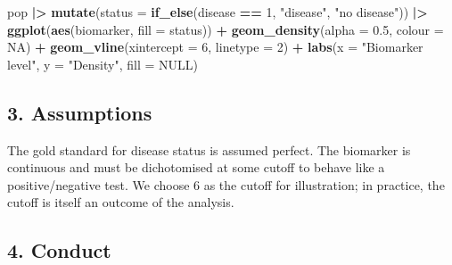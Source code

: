 \documentclass[
]{article}
\newenvironment{Shaded}{\begin{snugshade}}{\end{snugshade}}
\newcommand{\AttributeTok}[1]{\textcolor[rgb]{0.13,0.29,0.53}{#1}}
\newcommand{\ConstantTok}[1]{\textcolor[rgb]{0.56,0.35,0.01}{#1}}
\newcommand{\DecValTok}[1]{\textcolor[rgb]{0.00,0.00,0.81}{#1}}
\newcommand{\FloatTok}[1]{\textcolor[rgb]{0.00,0.00,0.81}{#1}}
\newcommand{\FunctionTok}[1]{\textcolor[rgb]{0.13,0.29,0.53}{\textbf{#1}}}
\newcommand{\NormalTok}[1]{#1}
\newcommand{\OtherTok}[1]{\textcolor[rgb]{0.56,0.35,0.01}{#1}}
\newcommand{\SpecialCharTok}[1]{\textcolor[rgb]{0.81,0.36,0.00}{\textbf{#1}}}
\newcommand{\StringTok}[1]{\textcolor[rgb]{0.31,0.60,0.02}{#1}}
\begin{document}
\begin{Shaded}
\begin{Highlighting}[]
\NormalTok{pop }\SpecialCharTok{|\textgreater{}}
  \FunctionTok{mutate}\NormalTok{(}\AttributeTok{status =} \FunctionTok{if\_else}\NormalTok{(disease }\SpecialCharTok{==} \DecValTok{1}\NormalTok{, }\StringTok{"disease"}\NormalTok{, }\StringTok{"no disease"}\NormalTok{)) }\SpecialCharTok{|\textgreater{}}
  \FunctionTok{ggplot}\NormalTok{(}\FunctionTok{aes}\NormalTok{(biomarker, }\AttributeTok{fill =}\NormalTok{ status)) }\SpecialCharTok{+}
  \FunctionTok{geom\_density}\NormalTok{(}\AttributeTok{alpha =} \FloatTok{0.5}\NormalTok{, }\AttributeTok{colour =} \ConstantTok{NA}\NormalTok{) }\SpecialCharTok{+}
  \FunctionTok{geom\_vline}\NormalTok{(}\AttributeTok{xintercept =} \DecValTok{6}\NormalTok{, }\AttributeTok{linetype =} \DecValTok{2}\NormalTok{) }\SpecialCharTok{+}
  \FunctionTok{labs}\NormalTok{(}\AttributeTok{x =} \StringTok{"Biomarker level"}\NormalTok{, }\AttributeTok{y =} \StringTok{"Density"}\NormalTok{, }\AttributeTok{fill =} \ConstantTok{NULL}\NormalTok{)}
\end{Highlighting}
\end{Shaded}

\subsection{3. Assumptions}\label{assumptions}

The gold standard for disease status is assumed perfect. The biomarker
is continuous and must be dichotomised at some cutoff to behave like a
positive/negative test. We choose 6 as the cutoff for illustration; in
practice, the cutoff is itself an outcome of the analysis.

\begin{Shaded}
\end{Shaded}

\subsection{4. Conduct}\label{conduct}
\end{document}
